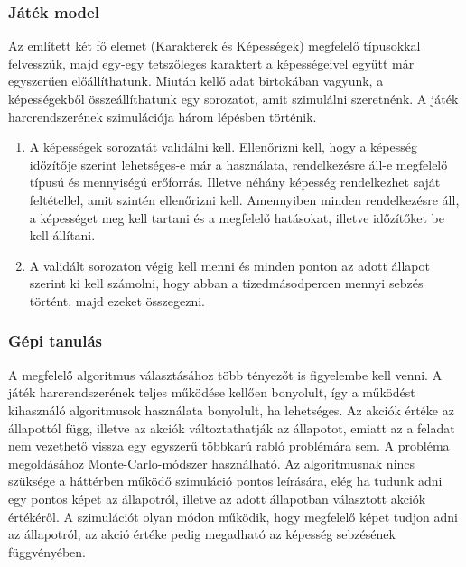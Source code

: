 \documentclass[12pt]{article}
\begin{document}
\subsubsection{Játék model}

Az említett két fő elemet (Karakterek és Képességek) megfelelő típusokkal felvesszük, majd egy-egy tetszőleges karaktert a képességeivel együtt már egyszerűen előállíthatunk.
Miután kellő adat birtokában vagyunk, a képességekből összeállíthatunk egy sorozatot, amit szimulálni szeretnénk.
\newline
A játék harcrendszerének szimulációja három lépésben történik.
\begin{enumerate}
	\item A képességek sorozatát validálni kell. Ellenőrizni kell, hogy a képesség időzítője szerint lehetséges-e már a használata, rendelkezésre áll-e megfelelő típusú és mennyiségú erőforrás. Illetve néhány képesség rendelkezhet saját feltétellel, amit szintén ellenőrizni kell. Amennyiben minden rendelkezésre áll, a képességet meg kell tartani és a megfelelő hatásokat, illetve időzítőket be kell állítani.
	\item A validált sorozaton végig kell menni és minden ponton az adott állapot szerint ki kell számolni, hogy abban a tizedmásodpercen mennyi sebzés történt, majd ezeket összegezni.
\end{enumerate}

\subsubsection{Gépi tanulás}

A megfelelő algoritmus választásához több tényezőt is figyelembe kell venni. A játék harcrendszerének teljes működése kellően bonyolult, így a működést kihasználó algoritmusok használata bonyolult, ha lehetséges. 
Az akciók értéke az állapottól függ, illetve az akciók változtathatják az állapotot, emiatt az a feladat nem vezethető vissza egy egyszerű többkarú rabló problémára sem.
\newline
A probléma megoldásához Monte-Carlo-módszer használható. Az algoritmusnak nincs szüksége a háttérben működő szimuláció pontos leírására, elég ha tudunk adni egy pontos képet az állapotról, illetve az adott állapotban választott akciók értékéről.
\newline
A szimulációt olyan módon működik, hogy megfelelő képet tudjon adni az állapotról, az akció értéke pedig megadható az képesség sebzésének függvényében.
\end{document}
